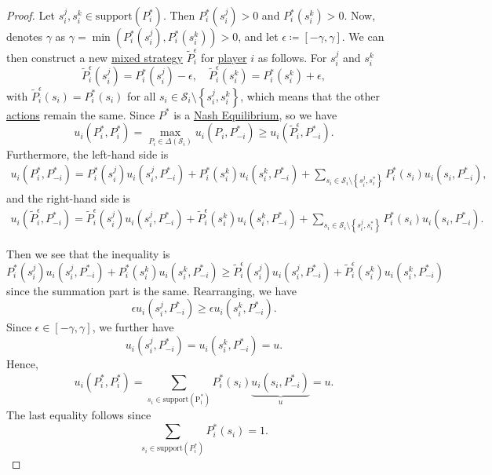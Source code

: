 \begin{proof}
	Let \(s_{i}^j, s_{i}^k\in \mathrm{support}(P_i^{\ast}) \). Then \(P_i^{\ast}(s_{i}^j)>0\) and \(P_i^{\ast}(s_{i}^k)>0\). Now, denotes \(\gamma\) as
	\(\gamma = \min\left(P_i^{\ast}(s_{i}^j), P_i^{\ast}(s_{i}^k)\right)>0\), and let \(\epsilon\coloneqq \left[-\gamma, \gamma\right]\). We can then
	construct a new \hyperref[def:mixed-strategy]{mixed strategy} \(\widetilde{P}_{i}^{\epsilon}\) for \hyperref[def:player]{player} \(i\) as follows.
	For \(s_{i}^j\) and \(s_{i}^k\)
	\[
		\widetilde{P}_{i}^{\epsilon}(s_{i}^j) = P_i^{\ast}(s_{i}^j)- \epsilon,\quad\widetilde{P}_{i}^{\epsilon}(s_{i}^k) = P_i^{\ast}(s_{i}^k)+\epsilon,
	\]
	with \(\widetilde{P}_{i}^{\epsilon}(s_{i}) = P_i^{\ast}(s_{i})\) for all \(s_{i}\in \mathcal{S}_{i}\setminus\left\{s_{i}^j, s_{i}^k\right\}\),
	which means that the other \hyperref[def:strategy]{actions} remain the same. Since \(P^{\ast}\) is a \hyperref[def:Nash-equilibrium]{Nash Equilibrium}, so we have
	\[
		u_{i}\left(P^{\ast}_i, P_{i}^{\ast}\right) = \max_{P_{i}\in \Delta(\mathcal{S}_{i})} u_{i}(P_{i}, P_{-i}^{\ast}) \geq u_{i}(\widetilde{P}_{i}^{\epsilon}, P_{-i}^{\ast}).
	\]
	Furthermore, the left-hand side is
	\[
		\begin{split}
			u_{i}\left(P^{\ast}_i, P_{-i}^{\ast}\right) = P_{i}^{\ast}(s_{i}^j)u_{i}(s_{i}^j, P^{\ast}_{-i}) + P^{\ast}_{i}(s_{i}^{k})u_{i}(s_{i}^{k}, P^{\ast}_{-i})
			+ \sum\limits_{ s_{i}\in \mathcal{S}_{i}\setminus\left\{s_{i}^j, s_{i}^*\right\}} P^{\ast}_{i}(s_{i})u_{i}(s_{i}, P^{\ast}_{-i}),
		\end{split}
	\]
	and the right-hand side is
	\[
		\begin{split}
			u_{i}\left(\widetilde{P}^{\epsilon}_i, P_{-i}^{\ast}\right) = \widetilde{P}_{i}^{\epsilon}(s_{i}^j)u_{i}(s_{i}^j, P^{\ast}_{-i}) + \widetilde{P}^{\epsilon}_{i}(s_{i}^{k})u_{i}(s_{i}^{k}, P^{\ast}_{-i})
			+ \sum\limits_{ s_{i}\in \mathcal{S}_{i}\setminus\left\{s_{i}^j, s_{i}^*\right\}} P^{\ast}_{i}(s_{i})u_{i}(s_{i}, P^{\ast}_{-i}).
		\end{split}
	\]

	Then we see that the inequality is
	\[
		P_{i}^{\ast}(s_{i}^j)u_{i}(s_{i}^j, P_{-i}^{\ast})+ P_{i}^{\ast}(s_{i}^k)u_{i}(s_{i}^k, P_{-i}^{\ast})\geq \widetilde{P}_{i}^{\epsilon}(s_{i}^j)u_{i}(s_{i}^j, P^{\ast}_{-i})+\widetilde{P}_{i}^{\epsilon}(s_{i}^k)u_{i}(s_{i}^k, P^{\ast}_{-i})
	\]
	since the summation part is the same. Rearranging, we have
	\[
		\epsilon u_{i}(s_{i}^j, P^{\ast}_{-i})\geq \epsilon u_{i}(s_{i}^k, P^{\ast}_{-i}).
	\]
	Since \(\epsilon\in\left[-\gamma, \gamma\right]\), we further have
	\[
		u_{i}(s_{i}^j, P^{\ast}_{-i}) = u_{i}(s_{i}^k, P^{\ast}_{-i}) = u.
	\]
	Hence,
	\[
		u_{i}(P^{\ast}_{i}, P^{\ast}_{i}) = \sum\limits_{s_{i}\in \mathrm{\text{support}(P^{\ast}_{i})} }P^{\ast}_{i}(s_{i})\underbrace{u_{i}(s_{i}, P^{\ast}_{-i})}_{u} = u.
	\]
	The last equality follows since
	\[
		\sum\limits_{s_{i}\in \mathrm{support}(P^{\ast}_i) } P_{i}^{\ast}(s_{i}) = 1.
	\]
\end{proof}

